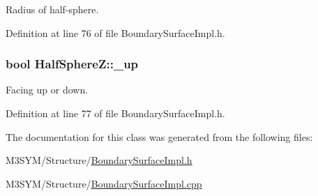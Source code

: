 Radius of half-\/sphere. 



Definition at line 76 of file Boundary\+Surface\+Impl.\+h.

\hypertarget{classHalfSphereZ_a6e7d1ea96f0f16716ebc5dd5434d601a}{
\subsubsection[{\+\_\+up}]{\setlength{\rightskip}{0pt plus 5cm}bool Half\+Sphere\+Z\+::\+\_\+up\hspace{0.3cm}{\ttfamily [private]}}}\label{classHalfSphereZ_a6e7d1ea96f0f16716ebc5dd5434d601a}


Facing up or down. 



Definition at line 77 of file Boundary\+Surface\+Impl.\+h.



The documentation for this class was generated from the following files\+:\begin{DoxyCompactItemize}
\item 
M3\+S\+Y\+M/\+Structure/\hyperlink{BoundarySurfaceImpl_8h}{Boundary\+Surface\+Impl.\+h}\item 
M3\+S\+Y\+M/\+Structure/\hyperlink{BoundarySurfaceImpl_8cpp}{Boundary\+Surface\+Impl.\+cpp}\end{DoxyCompactItemize}
